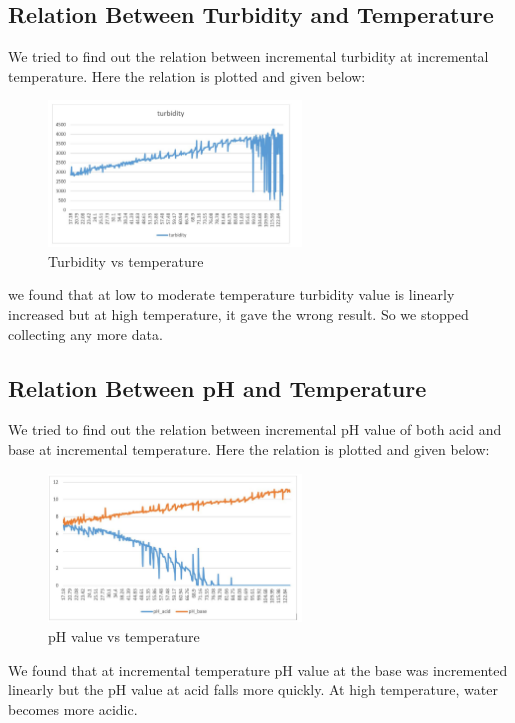 \subsection{Relation Between Turbidity and Temperature}
We tried to find out the relation between incremental turbidity at incremental temperature. 
Here the relation is plotted and given below: 

\begin{figure}[H]
\centering
\includegraphics[width=0.6\textwidth]{figures/temp2tur.JPG}
\caption{Turbidity vs temperature}
\label{sample}
\end{figure}
we found that at low to moderate temperature turbidity value is linearly increased but at high temperature, it gave the wrong result. So we stopped collecting any more data.

\subsection{Relation Between pH and Temperature}
We tried to find out the relation between incremental pH value of both acid and base at incremental temperature. 
Here the relation is plotted and given below: 

\begin{figure}[H]
\centering
\includegraphics[width=0.6\textwidth]{figures/temp2ph.JPG}
\caption{pH value vs temperature}
\label{sample}
\end{figure}
We found that at incremental temperature pH value at the base was incremented linearly but the pH value at acid falls more quickly. At high temperature, water becomes more acidic.

